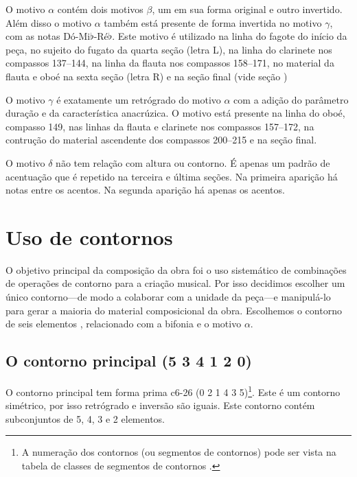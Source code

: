 O motivo $\alpha$ contém dois motivos $\beta$, um em sua forma
original e outro invertido. Além disso o motivo $\alpha$ também está
presente de forma invertida no motivo $\gamma$, com as notas
Dó-Mi$\flat$-Ré$\flat$. Este motivo é utilizado na linha do fagote do
início da peça, no sujeito do fugato da quarta seção (letra L), na
linha do clarinete nos compassos 137--144, na linha da flauta nos
compassos 158--171, no material da flauta e oboé na sexta seção (letra
R) e na seção final (vide seção )

O motivo $\gamma$ é exatamente um retrógrado do motivo $\alpha$ com a
adição do parâmetro duração e da característica anacrúzica. O motivo
está presente na linha do oboé, compasso 149, nas linhas da flauta e
clarinete nos compassos 157--172, na contrução do material ascendente
dos compassos 200--215 e na seção final.

O motivo $\delta$ não tem relação com altura ou contorno. É apenas um
padrão de acentuação que é repetido na terceira e última seções. Na
primeira aparição há notas  entre os acentos. Na segunda
aparição há apenas os acentos.

\section{Uso de contornos}
\label{sec:uso-de-contornos}

O objetivo principal da composição da obra \obra{} foi o uso
sistemático de combinações de operações de contorno para a criação
musical. Por isso decidimos escolher um único contorno---de modo a
colaborar com a unidade da peça---e manipulá-lo para gerar a maioria
do material composicional da obra. Escolhemos o contorno de seis
elementos \contpr{}, relacionado com a bifonia e o motivo $\alpha$.

\subsection{O contorno principal (5 3 4 1 2 0)}
\label{sec:o-contorno-principal}

O contorno principal \contpr{} tem forma prima c6-26 (0 2 1 4 3
5)\footnote{A numeração dos contornos (ou segmentos de contornos) pode
  ser vista na tabela de classes de segmentos de contornos
  \cite{marvin.ea87:relating}.}. Este é um contorno simétrico, por
isso retrógrado e inversão são iguais. Este contorno contém
subconjuntos de 5, 4, 3 e 2 elementos.

